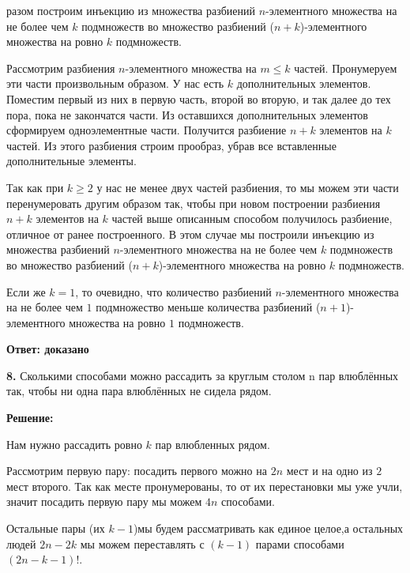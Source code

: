 \documentclass[a4paper,12pt]{article} %
\begin{document}
разом построим инъекцию из множества разбиений $n$-элементного множества на не более чем $k$ подмножеств во множество разбиений ($n+k$)-элементного множества на ровно $k$ подмножеств.

Рассмотрим разбиения $n$-элементного множества на $m \leqslant k$ частей. Пронумеруем эти части произвольным образом. У нас есть $k$ дополнительных элементов. Поместим первый из них в первую часть, второй во вторую, и так далее до тех пора, пока не закончатся части. Из оставшихся дополнительных элементов сформируем одноэлементные части. Получится разбиение $n+k$ элементов на $k$ частей. Из этого разбиения строим прообраз, убрав все вставленные дополнительные элементы.

Так как при $k\geqslant 2$ у нас не менее двух частей разбиения, то мы можем эти части перенумеровать другим образом так, чтобы при новом построении разбиения $n+k$ элементов на $k$ частей выше описанным способом получилось разбиение, отличное от ранее построенного. В этом случае мы построили инъекцию из множества разбиений $n$-элементного множества на не более чем $k$ подмножеств во множество разбиений ($n+k$)-элементного множества на ровно $k$ подмножеств.

Если же $k=1$, то очевидно, что количество разбиений $n$-элементного множества на не более чем $1$ подмножество меньше количества разбиений ($n+1$)-элементного множества на ровно $1$ подмножеств.


\begin{flushright}
\begin{large}
\textbf {Ответ: доказано}
\end{large}
\end{flushright}

{\bf 8.} Сколькими способами можно рассадить за круглым столом n пар
влюблённых так, чтобы ни одна пара влюблённых не сидела рядом.
\begin{center}
\bfseries
{\Large Решение: }
\end{center}

Нам нужно рассадить ровно $k$ пар влюбленных рядом.

Рассмотрим первую пару: посадить первого можно на $2n$ мест и на одно из $2$ мест второго. Так как месте пронумерованы, то от их перестановки мы уже учли, значит посадить первую пару мы можем $4n$ способами. 

Остальные пары (их $k - 1$)мы будем рассматривать как единое целое,а остальных людей $2n-2k$  мы можем переставлять с $(k - 1)$ парами способами $(2n - k - 1)!$.
\end{document}
